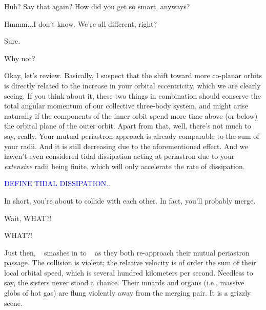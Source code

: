 \documentclass[main.tex]{subfiles}
\begin{document}
\par \Taygete  Huh?  Say that again?  How did you get so smart, anyways?

\par \Celaeno Hmmm...I don't know.  We're all different, right? 

\par \Alcyone Sure.

\par \Taygete Why not?

\par \Celaeno Okay, let's review.  Basically, I suspect that the shift toward more co-planar orbits is directly related to the increase in your orbital eccentricity, which we are clearly seeing.  If you think about it, these two things in combination should conserve the total angular momentum of our collective three-body system, and might arise naturally if the components of the inner orbit spend more time above (or below) the orbital plane of the outer orbit.  Apart from that, well, there's not much to say, really.  Your mutual periastron approach is already comparable to the sum of your radii.  And it is still decreasing due to the aforementioned effect.  And we haven't even considered tidal dissipation acting at periastron due to your \textit{extensive} radii being finite, which will only accelerate the rate of dissipation.

\begin{tcolorbox}[sharp corners, colback=blue!30, colframe=blue!80!blue, title=Torque]
\par \textcolor{blue}{DEFINE TIDAL DISSIPATION.}.  
\end{tcolorbox}

\par \Celaeno In short, you're about to collide with each other.  In fact, you'll probably merge.

\par \Taygete  Wait, WHAT?!

\par \Alcyone  WHAT?!

\par \nar Just then, \rmtaygete~ smashes in to \rmalcyone~ as they both re-approach their mutual periastron passage.  The collision is violent; the relative velocity is of order the sum of their local orbital speed, which is several hundred kilometers per second.  Needless to say, the sisters never stood a chance.  Their innards and organs (i.e., massive globs of hot gas) are flung violently away from the merging pair.  It is a grizzly scene.
\end{document}
